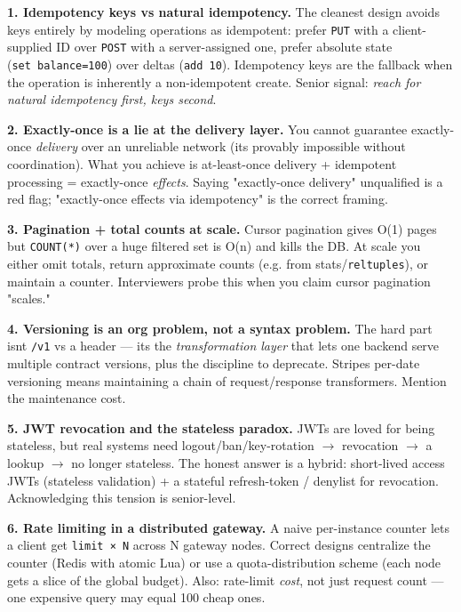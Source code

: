 \documentclass[11pt]{article}
\begin{document}
\textbf{1. Idempotency keys vs natural idempotency.} The cleanest design avoids keys entirely by modeling operations as idempotent: prefer \texttt{PUT} with a client-supplied ID over \texttt{POST} with a server-assigned one, prefer absolute state (\texttt{set\ balance=100}) over deltas (\texttt{add\ 10}). Idempotency keys are the fallback when the operation is inherently a non-idempotent create. Senior signal: \emph{reach for natural idempotency first, keys second}.

\textbf{2. Exactly-once is a lie at the delivery layer.} You cannot guarantee exactly-once \emph{delivery} over an unreliable network (it\textquotesingle s provably impossible without coordination). What you achieve is at-least-once delivery + idempotent processing = exactly-once \emph{effects}. Saying "exactly-once delivery" unqualified is a red flag; "exactly-once effects via idempotency" is the correct framing.

\textbf{3. Pagination + total counts at scale.} Cursor pagination gives O(1) pages but \texttt{COUNT(*)} over a huge filtered set is O(n) and kills the DB. At scale you either omit totals, return approximate counts (e.g. from stats/\texttt{reltuples}), or maintain a counter. Interviewers probe this when you claim cursor pagination "scales."

\textbf{4. Versioning is an org problem, not a syntax problem.} The hard part isn\textquotesingle t \texttt{/v1} vs a header --- it\textquotesingle s the \emph{transformation layer} that lets one backend serve multiple contract versions, plus the discipline to deprecate. Stripe\textquotesingle s per-date versioning means maintaining a chain of request/response transformers. Mention the maintenance cost.

\textbf{5. JWT revocation and the stateless paradox.} JWTs are loved for being stateless, but real systems need logout/ban/key-rotation \(\rightarrow\) revocation \(\rightarrow\) a lookup \(\rightarrow\) no longer stateless. The honest answer is a hybrid: short-lived access JWTs (stateless validation) + a stateful refresh-token / denylist for revocation. Acknowledging this tension is senior-level.

\textbf{6. Rate limiting in a distributed gateway.} A naive per-instance counter lets a client get \texttt{limit\ ×\ N} across N gateway nodes. Correct designs centralize the counter (Redis with atomic Lua) or use a quota-distribution scheme (each node gets a slice of the global budget). Also: rate-limit \emph{cost}, not just request count --- one expensive query may equal 100 cheap ones.
\end{document}
